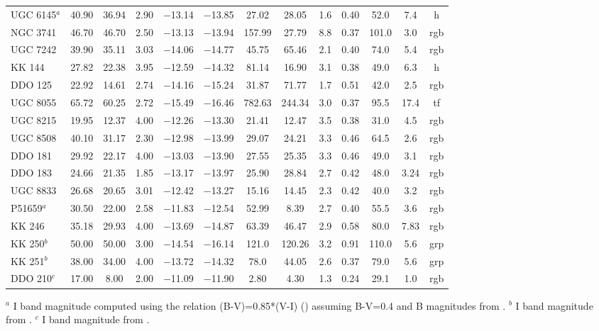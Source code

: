 \documentclass[useAMS,usenatbib]{mn2e}
\begin{document}
\begin{table}
\begin{tabular}{|l|c|c|c|c|c|c|c|c|c|c|c|c|}
  UGC 6145$^a$ & 40.90 & 36.94 & 2.90 & $-$13.14 & $-$13.85 & 27.02  & 28.05 &  1.6 & 0.40 & 52.0 & 7.4 &h\\
  NGC 3741     & 46.70 & 46.70 & 2.50 & $-$13.13 & $-$13.94 & 157.99 & 27.79 &  8.8 & 0.37 & 101.0& 3.0 &rgb\\
  UGC 7242     & 39.90 & 35.11 & 3.03 & $-$14.06 & $-$14.77 & 45.75  & 65.46 &  2.1 & 0.40 & 74.0 & 5.4 &rgb\\
  KK 144       & 27.82 & 22.38 & 3.95 & $-$12.59 & $-$14.32 & 81.14  & 16.90 & 3.1  & 0.38 & 49.0 & 6.3 &h\\
  DDO 125      & 22.92 & 14.61 & 2.74 & $-$14.16 & $-$15.24 & 31.87  & 71.77 &  1.7 & 0.51 & 42.0 & 2.5 &rgb \\
  UGC 8055     & 65.72 & 60.25 & 2.72 & $-$15.49 & $-$16.46 & 782.63 & 244.34&  3.0 & 0.37 & 95.5 & 17.4&tf\\
  UGC 8215     & 19.95 & 12.37 & 4.00 & $-$12.26 & $-$13.30 & 21.41  & 12.47 &  3.5 & 0.38 & 31.0 & 4.5 &rgb\\
  UGC 8508     & 40.10 & 31.17 & 2.30 & $-$12.98 & $-$13.99 & 29.07  & 24.21 &  3.3 & 0.46 & 64.5 & 2.6 &rgb\\
  DDO 181      & 29.92 & 22.17 & 4.00 & $-$13.03 & $-$13.90 & 27.55  & 25.35 &  3.3 & 0.46 & 49.0 & 3.1 &rgb\\
  DDO 183      & 24.66 & 21.35 & 1.85 & $-$13.17 & $-$13.97 & 25.90  & 28.84 &  2.7 & 0.42 & 48.0 & 3.24&rgb\\
  UGC 8833     & 26.68 & 20.65 & 3.01 & $-$12.42 & $-$13.27 & 15.16  & 14.45 &  2.3 & 0.42 & 40.0 & 3.2 &rgb\\
  P51659$^a$   & 30.50 & 22.00 & 2.58 & $-$11.83 & $-$12.54 & 52.99  & 8.39  &  2.7 & 0.40 & 55.5 & 3.6 &rgb\\
  KK 246       & 35.18 & 29.93 & 4.00 & $-$13.69 & $-$14.87 & 63.39  & 46.47 &  2.9 & 0.58 & 80.0 & 7.83&rgb\\
  KK 250$^b$   & 50.00 & 50.00 & 3.00 & $-$14.54 & $-$16.14 & 121.0  & 120.26& 3.2  & 0.91 & 110.0& 5.6 &  grp\\
  KK 251$^b$   & 38.00 & 34.00 & 4.00 & $-$13.72 & $-$14.32 & 78.0   & 44.05 & 2.6  & 0.37 & 79.0 & 5.6 & grp\\
  DDO 210$^c$  & 17.00 & 8.00  & 2.00 & $-$11.09 & $-$11.90 & 2.80   & 4.30  &  1.3 & 0.24 & 29.1 & 1.0 &rgb\\
\hline
\end{tabular}
$^a$ I band magnitude computed using the relation (B-V)=0.85*(V-I) (\cite{makarova99}) assuming B-V=0.4 and B magnitudes from \cite{kk04}.
$^b$ I band magnitude from \cite{bc04}.
$^c$ I band magnitude from \cite{lee99}.
\end{table}
\end{document}
